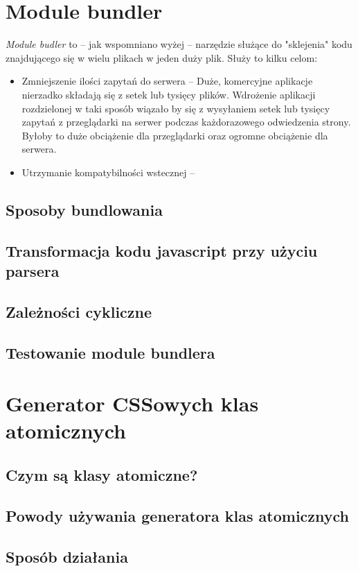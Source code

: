 \documentclass{SGGW-thesis}
\begin{document}
\chapter{Module bundler}
\emph{Module budler} to -- jak wspomniano wyżej -- narzędzie służące do "sklejenia" kodu znajdującego się w wielu plikach w jeden duży plik. Służy to kilku celom:
\begin{itemize}
    \item Zmniejszenie ilości zapytań do serwera -- Duże, komercyjne aplikacje nierzadko składają się z setek lub tysięcy plików. Wdrożenie aplikacji rozdzielonej w taki sposób wiązało by się z wysyłaniem setek lub tysięcy zapytań z przeglądarki na serwer podczas każdorazowego odwiedzenia strony. Byłoby to duże obciążenie dla przeglądarki oraz ogromne obciążenie dla serwera.
    \item Utrzymanie kompatybilności wstecznej -- 
\end{itemize}

\section{Sposoby bundlowania}
\section{Transformacja kodu javascript przy użyciu parsera}
\section{Zależności cykliczne}
\section{Testowanie module bundlera}

\chapter{Generator CSSowych klas atomicznych}
\section{Czym są klasy atomiczne?}
\section{Powody używania generatora klas atomicznych}
\section{Sposób działania}
\end{document}
